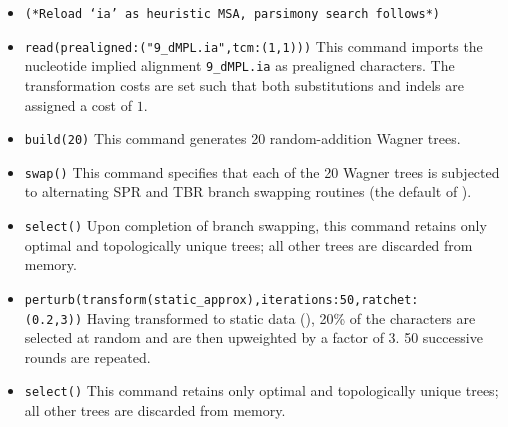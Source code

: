 \begin{itemize}
\item \texttt{(*Reload `ia' as heuristic MSA, parsimony search follows*)}
\item \texttt{read(prealigned:("9\_dMPL.ia",tcm:(1,1)))} This command imports the nucleotide implied 
alignment \texttt{9\_dMPL.ia} as prealigned characters. The transformation costs are set such that both 
substitutions and indels are assigned a cost of $1$.
\item \texttt{build(20)} This command generates 20 random-addition Wagner trees.
\item \texttt{swap()} This command specifies that each of the 20 Wagner trees is subjected to alternating SPR and 
TBR branch swapping routines (the default of \poy).
\item \texttt{select()} Upon completion of branch swapping, this command retains only optimal and topologically 
unique trees; all other trees are discarded from memory. 
\item \texttt{perturb(transform(static\_approx),iterations:50,ratchet:\\(0.2,3))} Having transformed to static data 
(), 20\% of the characters are selected at random and are then upweighted by 
a factor of $3$.  50 successive rounds are repeated. 
\item \texttt{select()} This command retains only optimal and topologically 
unique trees; all other trees are discarded from memory.


\end{itemize}
